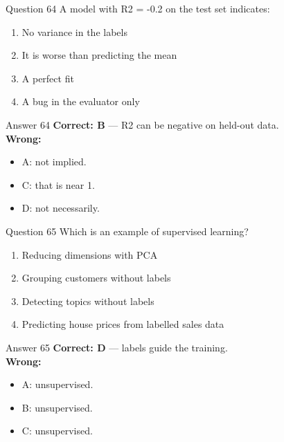 \documentclass[aspectratio=169,11pt]{beamer}
\begin{document}
\begin{frame}{Question 64}
A model with R2 = -0.2 on the test set indicates:
\begin{enumerate}[label=\Alph*.]
\item No variance in the labels
\item It is worse than predicting the mean
\item A perfect fit
\item A bug in the evaluator only
\end{enumerate}
\end{frame}
\begin{frame}{Answer 64}
\textbf{Correct: B} --- R2 can be negative on held-out data.\\
\vspace{0.5em}
\textbf{Wrong:}
\begin{itemize}
\item A: not implied.
\item C: that is near 1.
\item D: not necessarily.
\end{itemize}
\end{frame}

\begin{frame}{Question 65}
Which is an example of supervised learning?
\begin{enumerate}[label=\Alph*.]
\item Reducing dimensions with PCA
\item Grouping customers without labels
\item Detecting topics without labels
\item Predicting house prices from labelled sales data
\end{enumerate}
\end{frame}
\begin{frame}{Answer 65}
\textbf{Correct: D} --- labels guide the training.\\
\vspace{0.5em}
\textbf{Wrong:}
\begin{itemize}
\item A: unsupervised.
\item B: unsupervised.
\item C: unsupervised.
\end{itemize}
\end{frame}
\end{document}
